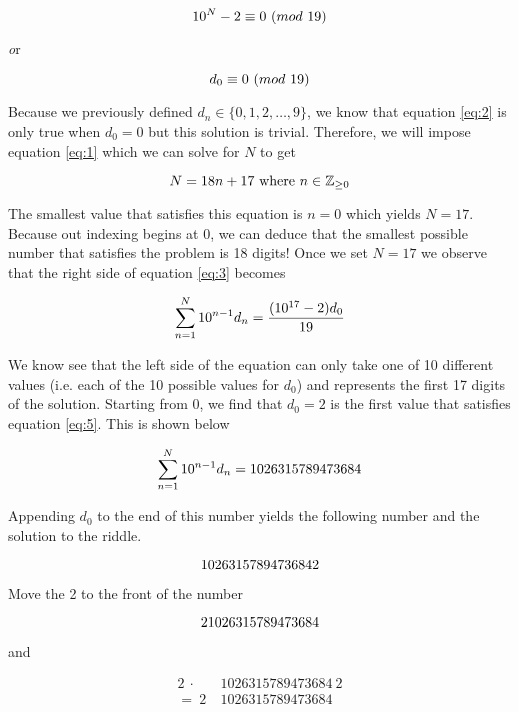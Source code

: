 \documentclass[a4paper,12pt]{article}
\begin{document}
\begin{equation} \label{eq:1}
10^N-2 \equiv 0 \ (mod \ 19)\smallskip
\end{equation}

\noindent \textit or \smallskip

\begin{equation} \label{eq:2}
d_0 \equiv 0 \ (mod \ 19)\smallskip
\end{equation}

\noindent Because we previously defined $d_n \in \{0,1,2,\ldots,9\}$, we
know that equation \ref{eq:2} is only true when $d_0=0$ but this solution is 
trivial. Therefore, we will impose equation \ref{eq:1} which we can solve 
for $N$ to get\smallskip

\begin{equation}
N=18n+17 \mbox{ where } n \in \mathbb{Z}_{\geq 0}\smallskip
\end{equation}

\noindent The smallest value that satisfies this equation is $n=0$ which 
yields $N=17$.  Because out indexing begins at 0, we can deduce that the 
smallest possible number that satisfies the problem is 18 digits!  Once we 
set $N=17$ we observe that the right side of equation \ref{eq:3} becomes
\smallskip

\begin{equation}
\sum^N_{n=1}10^{n-1}d_n=\frac{(10^{17}-2)d_0}{19}\smallskip
\end{equation}

\noindent We know see that the left side of the equation can only take one 
of 10 different values (i.e. each of the 10 possible values for $d_0$) and 
represents the first 17 digits of the solution.  Starting from 0, we find 
that $d_0=2$ is the first value that satisfies equation \ref{eq:5}.  
This is shown below\smallskip

\begin{equation}
\sum^N_{n=1}10^{n-1}d_n=1026315789473684\smallskip
\end{equation}

\noindent Appending $d_0$ to the end of this number yields the following
number and the solution to the riddle.\smallskip  

\begin{equation}
10263157894736842\smallskip
\end{equation}

\noindent Move the 2 to the front of the number\smallskip

\begin{equation}
21026315789473684\smallskip
\end{equation}

\noindent and\smallskip

\begin{align*}
2 \ \cdot \ & 1026315789473684 \ 2 \\
    = \ 2 \ & 1026315789473684
\end{align*}
\end{document}
